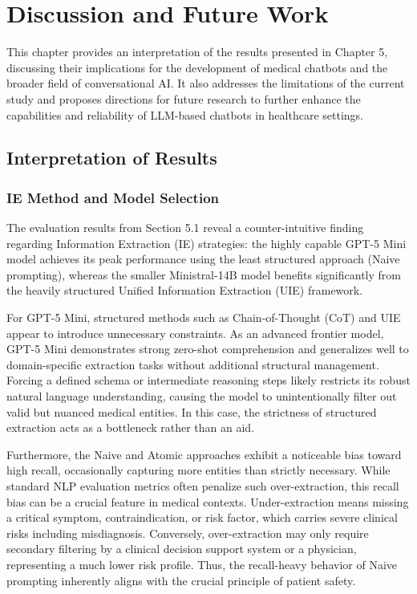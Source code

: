 \chapter{Discussion and Future Work}

This chapter provides an interpretation of the results presented in Chapter 5, discussing their implications for the development of medical chatbots and the broader field of conversational AI.
It also addresses the limitations of the current study and proposes directions for future research to further enhance the capabilities and reliability of LLM-based chatbots in healthcare settings.

\section{Interpretation of Results}

\subsection{IE Method and Model Selection}

The evaluation results from Section 5.1 reveal a counter-intuitive finding regarding Information Extraction (IE) strategies: the highly capable GPT-5 Mini model achieves its peak performance using the least structured approach (Naive prompting), whereas the smaller Ministral-14B model benefits significantly from the heavily structured Unified Information Extraction (UIE) framework.

For GPT-5 Mini, structured methods such as Chain-of-Thought (CoT) and UIE appear to introduce unnecessary constraints. 
As an advanced frontier model, GPT-5 Mini demonstrates strong zero-shot comprehension and generalizes well to domain-specific extraction tasks without additional structural management.
Forcing a defined schema or intermediate reasoning steps likely restricts its robust natural language understanding, causing the model to unintentionally filter out valid but nuanced medical entities. 
In this case, the strictness of structured extraction acts as a bottleneck rather than an aid.

Furthermore, the Naive and Atomic approaches exhibit a noticeable bias toward high recall, occasionally capturing more entities than strictly necessary. 
While standard NLP evaluation metrics often penalize such over-extraction, this recall bias can be a crucial feature in medical contexts. 
Under-extraction means missing a critical symptom, contraindication, or risk factor, which carries severe clinical risks including misdiagnosis.
Conversely, over-extraction may only require secondary filtering by a clinical decision support system or a physician, representing a much lower risk profile. 
Thus, the recall-heavy behavior of Naive prompting inherently aligns with the crucial principle of patient safety.

